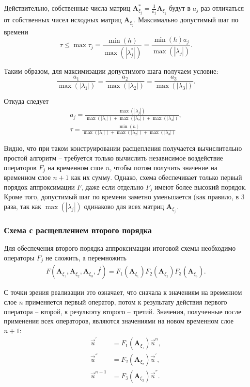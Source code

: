 Действительно, собственные числа матриц $\mathbf A_{\xi_j}^* = \frac{1}{a_j} \mathbf A_{\xi_j}$ будут в $a_j$ раз отличаться от собственных чисел исходных матриц $\mathbf A_{\xi_j}$. Максимально допустимый шаг по времени
\begin{equation}
\tau \le \max{\tau_j} = \frac{\min(h)}{\max(|\lambda_j^*|)} = \frac{\min(h)a_j}{\max(|\lambda_j|)}.
\end{equation}

Таким образом, для максимизации допустимого шага получаем условие:
\begin{equation}
\frac{a_1}{\max(|\lambda_1|)} = \frac{a_2}{\max(|\lambda_2|)} = \frac{a_3}{\max(|\lambda_3|)}.
\end{equation}

Откуда следует
\begin{align}
a_j = \frac{\max(|\lambda_j|)}{\max(|\lambda_1|)+\max(|\lambda_2|)+\max(|\lambda_3|)},\nonumber\\
\tau = \frac{\min(h)}{\max(|\lambda_1|)+\max(|\lambda_2|)+\max(|\lambda_3|)}
\end{align}

Видно, что при таком конструировании расщепления получается вычислительно простой алгоритм -- требуется только вычислить независимое воздействие операторов $F_j$ на временном слое $n$, чтобы потом получить значение на временном слое $n+1$ как их сумму. Однако, схема обеспечивает только первый порядок аппроксимации $F$, даже если отдельно $F_j$ имеют более высокий порядок. Кроме того, допустимый шаг по времени заметно уменьшается (как правило, в 3 раза, так как $\max(|\lambda_j|)$ одинаково для всех матриц $\mathbf A_{\xi_j}$.


\subsubsection{Схема с расщеплением второго порядка}

Для обеспечения второго порядка аппроксимации итоговой схемы необходимо операторы $F_j$ не сложить, а перемножить
\begin{align}
\label{split_scheme_2nd_order}
F(\mathbf A_{\xi_1}, \mathbf A_{\xi_2}, \mathbf A_{\xi_3}, \vec f) = F_1(\mathbf A_{\xi_1}) F_2(\mathbf A_{\xi_2}) F_3(\mathbf A_{\xi_3}).
\end{align}

С точки зрения реализации это означает, что сначала к значениям на временном слое $n$ применяется первый оператор, потом к результату действия первого оператора -- второй, к результату второго -- третий. Значения, полученные после применения всех операторов, являются значениями на новом временном слое $n+1$:
\begin{align}
\vec u^{'} &= F_1(\mathbf A_{\xi_1}) \vec u^n, \nonumber\\
\vec u^{''} &= F_2(\mathbf A_{\xi_2}) \vec u^{'}, \nonumber\\
\vec u^{n+1} &= F_3(\mathbf A_{\xi_3}) \vec u^{''}.
\end{align}

